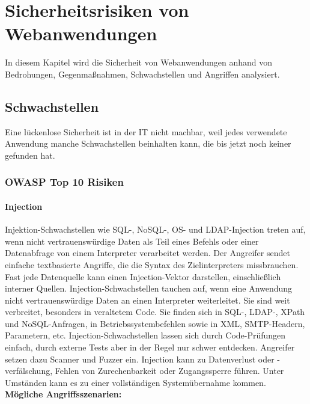 \chapter{Sicherheitsrisiken von Webanwendungen}
\label{chap:k3}

In diesem Kapitel wird die Sicherheit von Webanwendungen anhand von Bedrohungen, Gegenmaßnahmen, Schwachstellen und Angriffen analysiert.

\section{Schwachstellen}

Eine lückenlose Sicherheit ist in der IT nicht machbar, weil jedes verwendete Anwendung manche Schwachstellen beinhalten kann, die bis jetzt noch keiner gefunden hat.

\subsection{OWASP Top 10 Risiken}

\subsubsection{Injection}

Injektion-Schwachstellen wie SQL-, NoSQL-, OS- und LDAP-Injection treten auf,  wenn nicht vertrauenswürdige Daten als Teil eines Befehls oder einer Datenabfrage von einem Interpreter verarbeitet werden\cite[6]{owasp17top10}. Der Angreifer sendet einfache textbasierte Angriffe, die die Syntax des Zielinterpreters missbrauchen. Fast jede Datenquelle kann einen Injection-Vektor darstellen, einschließlich interner Quellen. Injection-Schwachstellen tauchen auf, wenn eine Anwendung nicht vertrauenswürdige Daten an einen Interpreter weiterleitet. Sie sind weit verbreitet, besonders in veraltetem Code. Sie finden sich in SQL-, LDAP-, XPath und NoSQL-Anfragen, in Betriebssystembefehlen sowie in XML, SMTP-Headern, Parametern, etc. Injection-Schwachstellen lassen sich durch Code-Prüfungen einfach, durch externe Tests aber in der Regel nur schwer entdecken. Angreifer setzen dazu Scanner und Fuzzer ein. Injection kann zu Datenverlust oder -verfälschung, Fehlen von Zurechenbarkeit oder Zugangssperre führen. Unter Umständen kann es zu einer vollständigen Systemübernahme kommen\cite[7]{owasp17top10}.\\

\textbf{Mögliche Angriffsszenarien:}


